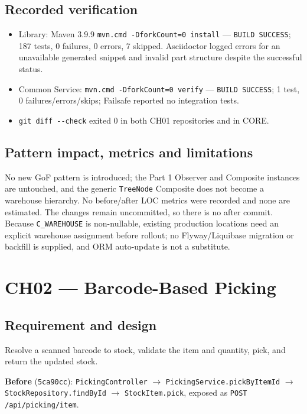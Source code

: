 \documentclass[11pt,a4paper]{article}
\newcommand{\code}[1]{\nolinkurl{#1}}
\begin{document}
\subsection{Recorded verification}
\begin{itemize}[nosep]
\item Library: Maven 3.9.9 \code{mvn.cmd -DforkCount=0 install} --- \texttt{BUILD SUCCESS}; 187 tests, 0 failures, 0 errors, 7 skipped. Asciidoctor logged errors for an unavailable generated snippet and invalid part structure despite the successful status.
\item Common Service: \code{mvn.cmd -DforkCount=0 verify} --- \texttt{BUILD SUCCESS}; 1 test, 0 failures/errors/skips; Failsafe reported no integration tests.
\item \code{git diff --check} exited 0 in both CH01 repositories and in CORE.
\end{itemize}

\subsection{Pattern impact, metrics and limitations}
No new GoF pattern is introduced; the Part 1 Observer and Composite instances are untouched, and the generic \code{TreeNode} Composite does not become a warehouse hierarchy. No before/after LOC metrics were recorded and none are estimated. The changes remain uncommitted, so there is no after commit. Because \code{C_WAREHOUSE} is non-nullable, existing production locations need an explicit warehouse assignment before rollout; no Flyway/Liquibase migration or backfill is supplied, and ORM auto-update is not a substitute.

\section{CH02 --- Barcode-Based Picking}

\subsection{Requirement and design}
Resolve a scanned barcode to stock, validate the item and quantity, pick, and return the updated stock.

\textbf{Before} (\code{5ca90cc}): \code{PickingController} $\rightarrow$ \code{PickingService.pickByItemId} $\rightarrow$ \code{StockRepository.findById} $\rightarrow$ \code{StockItem.pick}, exposed as \code{POST /api/picking/item}.
\end{document}
